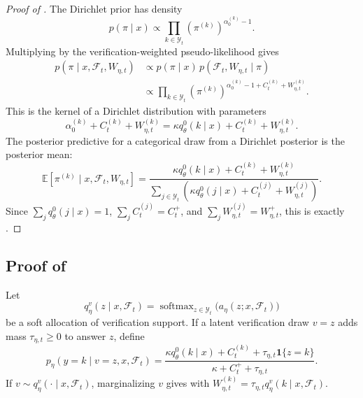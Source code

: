 \begin{proof}[Proof of ]
The Dirichlet prior has density
\[
    p(\pi\mid x)
    \propto
    \prod_{k\in\mathcal Y_t}
    \left(\pi^{(k)}\right)^{\alpha_0^{(k)}-1}.
\]
Multiplying by the verification-weighted pseudo-likelihood gives
\[
\begin{aligned}
    p(\pi\mid x,\mathcal F_t,W_{\eta,t})
    &\propto
    p(\pi\mid x)\,
    p(\mathcal F_t,W_{\eta,t}\mid \pi)\\
    &\propto
    \prod_{k\in\mathcal Y_t}
    \left(\pi^{(k)}\right)^{
    \alpha_0^{(k)}-1+C_t^{(k)}+W_{\eta,t}^{(k)}
    }.
\end{aligned}
\]
This is the kernel of a Dirichlet distribution with parameters
\[
    \alpha_0^{(k)}+C_t^{(k)}+W_{\eta,t}^{(k)}
    =
    \kappa q_\theta^0(k\mid x)+C_t^{(k)}+W_{\eta,t}^{(k)}.
\]
The posterior predictive for a categorical draw from a Dirichlet posterior is
the posterior mean:
\[
    \mathbb E[\pi^{(k)}\mid x,\mathcal F_t,W_{\eta,t}]
    =
    \frac{
    \kappa q_\theta^0(k\mid x)+C_t^{(k)}+W_{\eta,t}^{(k)}
    }{
    \sum_{j\in\mathcal Y_t}
    \left(\kappa q_\theta^0(j\mid x)+C_t^{(j)}+W_{\eta,t}^{(j)}\right)
    }.
\]
Since $\sum_j q_\theta^0(j\mid x)=1$,
$\sum_j C_t^{(j)}=C_t^+$, and
$\sum_j W_{\eta,t}^{(j)}=W_{\eta,t}^+$, this is exactly
.
\end{proof}

\subsection{Proof of }
\label{app:proof_lvd_marginalization}

\begin{lemma}
\label{lem:lvd_marginalization}
Let
\begin{equation}
    q_\eta^v(z\mid x,\mathcal F_t)
    =
    \operatorname{softmax}_{z\in\mathcal Y_t}
    \bigl(a_\eta(z;x,\mathcal F_t)\bigr)
    \label{eq:verification_direction}
\end{equation}
be a soft allocation of verification support. If a latent verification draw
$v=z$ adds mass $\tau_{\eta,t}\ge 0$ to answer $z$, define
\begin{equation}
    p_\eta(y=k\mid v=z,x,\mathcal F_t)
    =
    \frac{
    \kappa q_\theta^0(k\mid x)+C_t^{(k)}
    +\tau_{\eta,t}\mathbf 1\{z=k\}
    }{
    \kappa+C_t^+ +\tau_{\eta,t}
    }.
    \label{eq:lvd_conditional}
\end{equation}
If $v\sim q_\eta^v(\cdot\mid x,\mathcal F_t)$, marginalizing $v$ gives
 with
$W_{\eta,t}^{(k)}=\tau_{\eta,t}q_\eta^v(k\mid x,\mathcal F_t)$.
\end{lemma}

